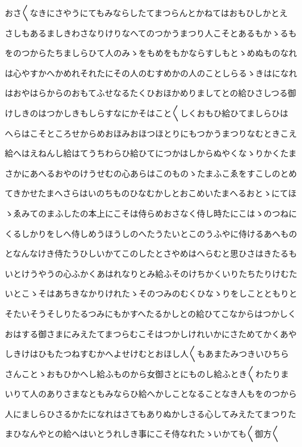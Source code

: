\documentclass[a4paper,11pt,landscape]{ltjtarticle}
\begin{document}
おさ〱なきにさやうにてもみならしたてまつらんとかねてはおもひしかとえ
\par\medskip
さしもあるましきわさなりけりなへてのつかうまつり人こそとあるもかゝるも
\par\medskip
をのつからたちましらひて人のみゝをもめをもかならすしもとゝめぬものなれ
\par\medskip
は心やすかへかめれそれたにその人のむすめかの人のことしらるゝきはになれ
\par\medskip
はおやはらからのおもてふせなるたくひおほかめりましてとの給ひさしつる御
\par\medskip
けしきのはつかしきもしらすなにかそはこと〱しくおもひ給ひてましらひは
\par\medskip
へらはこそところせからめおほみおほつほとりにもつかうまつりなむときこえ
\par\medskip
給へはえねんし給はてうちわらひ給ひてにつかはしからぬやくなゝりかくたま
\par\medskip
さかにあへるおやのけうせむの心あらはこのものゝたまふこゑをすこしのとめ
\par\medskip
てきかせたまへさらはいのちものひなむかしとおこめいたまへるおとゝにてほ
\par\medskip
ゝゑみてのまふしたの本上にこそは侍らめおさなく侍し時たにこはゝのつねに
\par\medskip
くるしかりをしへ侍しめうほうしのへたうたいとこのうふやに侍けるあへもの
\par\medskip
となんなけき侍たうひしいかてこのしたとさやめはへらむと思ひさはきたるも
\par\medskip
いとけうやうの心ふかくあはれなりとみ給ふそのけちかくいりたちたりけむた
\par\medskip
いとこゝそはあちきなかりけれたゝそのつみのむくひなゝりをしことともりと
\par\medskip
そたいそうそしりたるつみにもかすへたるかしとの給ひてこなからはつかしく
\par\medskip
おはする御さまにみえたてまつらむこそはつかしけれいかにさためてかくあや
\par\medskip
しきけはひもたつねすむかへよせけむとおほし人〱もあまたみつきいひちら
\par\medskip
さんことゝおもひかへし給ふものから女御さとにものし給ふとき〱わたりま
\par\medskip
いりて人のありさまなともみならひ給へかしことなることなき人もをのつから
\par\medskip
人にましらひさるかたになれはさてもありぬかしさる心してみえたてまつりた
\par\medskip
まひなんやとの給へはいとうれしき事にこそ侍なれたゝいかても〱御方〱
\end{document}

